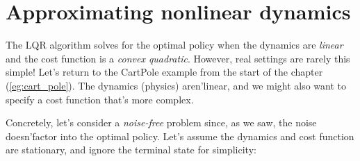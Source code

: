 \documentclass[../main/main]{subfiles}
\begin{document}

\section{Approximating nonlinear dynamics}

The LQR algorithm solves for the optimal policy when the dynamics are \emph{linear} and the cost function is a \emph{convex quadratic}.
However, real settings are rarely this simple!
Let's return to the CartPole example from the start of the chapter (\autoref{eg:cart_pole}).
The dynamics (physics) aren'\hi linear, and we might also want to specify a cost function that's more complex.

Concretely, let's consider a \emph{noise-free} problem since, as we saw, the noise doesn'\hi factor into the optimal policy. Let's assume the dynamics and cost function are stationary, and ignore the terminal state for simplicity:
\end{document}
